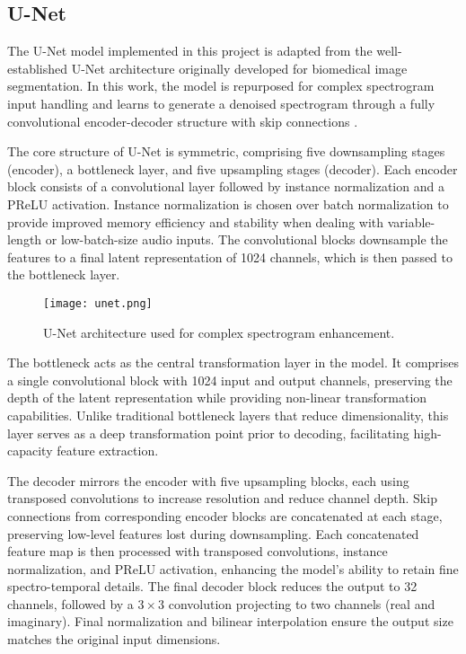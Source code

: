 \subsection{U-Net}
\label{sec:unet}

The U-Net model implemented in this project is adapted from the well-established U-Net architecture originally developed for biomedical image segmentation. In this work, the model is repurposed for complex spectrogram input handling and learns to generate a denoised spectrogram through a fully convolutional encoder-decoder structure with skip connections \cite{ronneberger2015unet}.

The core structure of U-Net is symmetric, comprising five downsampling stages (encoder), a bottleneck layer, and five upsampling stages (decoder). Each encoder block consists of a convolutional layer followed by instance normalization and a PReLU activation. Instance normalization is chosen over batch normalization to provide improved memory efficiency and stability when dealing with variable-length or low-batch-size audio inputs. The convolutional blocks downsample the features to a final latent representation of 1024 channels, which is then passed to the bottleneck layer.

\begin{figure}[h]
    \centering
    \texttt{[image: unet.png]}
    \caption{\label{fig:unet}U-Net architecture used for complex spectrogram enhancement.}
\end{figure}

The bottleneck acts as the central transformation layer in the model. It comprises a single convolutional block with 1024 input and output channels, preserving the depth of the latent representation while providing non-linear transformation capabilities. Unlike traditional bottleneck layers that reduce dimensionality, this layer serves as a deep transformation point prior to decoding, facilitating high-capacity feature extraction.

The decoder mirrors the encoder with five upsampling blocks, each using transposed convolutions to increase resolution and reduce channel depth. Skip connections from corresponding encoder blocks are concatenated at each stage, preserving low-level features lost during downsampling. Each concatenated feature map is then processed with transposed convolutions, instance normalization, and PReLU activation, enhancing the model's ability to retain fine spectro-temporal details. The final decoder block reduces the output to 32 channels, followed by a $3 \times 3$ convolution projecting to two channels (real and imaginary). Final normalization and bilinear interpolation ensure the output size matches the original input dimensions.

